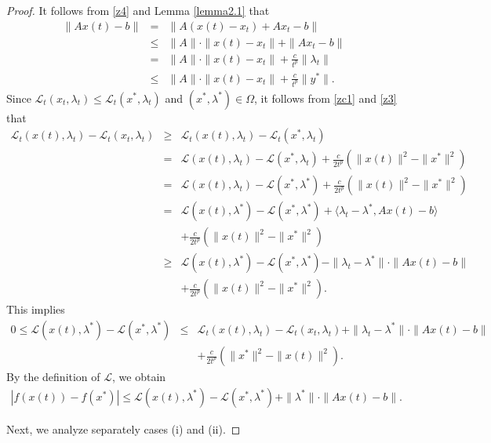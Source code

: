 \documentclass[review]{elsarticle}
\begin{document}
\begin{proof}
	It follows from \eqref{z4} and Lemma \ref{lemma2.1} that
		\begin{eqnarray}\label{zd1}
			\|Ax(t)-b\|&=&\|A(x(t)-x_t)+Ax_t-b\|\nonumber\\
			&\leq&\|A\|\cdot\|x(t)-x_t\|+\|Ax_t-b\|\nonumber\\
			&=&\|A\|\cdot\|x(t)-x_t\|+\frac{c}{t^p}\|\lambda_t\|\nonumber\\
			&\leq&\|A\|\cdot\|x(t)-x_t\|+\frac{c}{t^p}\|y^*\|.
		\end{eqnarray}	
		Since $\mathcal{L}_{t}(x_t,\lambda_t)\leq\mathcal{L}_{t}(x^*,\lambda_t)$ and  $(x^*,\lambda^*)\in\Omega$, it follows from \eqref{zc1} and \eqref{z3} that
		\begin{eqnarray*}
			\mathcal{L}_{t}(x(t),\lambda_t)-\mathcal{L}_{t}(x_t,\lambda_t)&\geq&\mathcal{L}_{t}(x(t),\lambda_t)-\mathcal{L}_{t}(x^*,\lambda_t)\\
			&=&\mathcal{L}(x(t),\lambda_t)-\mathcal{L}(x^*,\lambda_t)+\frac{c}{2t^p}\left(\|x(t)\|^2-\|x^*\|^2\right)\\
			&=&\mathcal{L}(x(t),\lambda_t)-\mathcal{L}(x^*,\lambda^*)+\frac{c}{2t^p}\left(\|x(t)\|^2-\|x^*\|^2\right)\\
			&=&\mathcal{L}(x(t),\lambda^*)-\mathcal{L}(x^*,\lambda^*)+\langle\lambda_t-\lambda^*, Ax(t)-b\rangle\\
			&&+\frac{c}{2t^p}\left(\|x(t)\|^2-\|x^*\|^2\right)\\
			&\geq&\mathcal{L}(x(t),\lambda^*)-\mathcal{L}(x^*,\lambda^*)-\|\lambda_t-\lambda^*\|\cdot\| Ax(t)-b\|\\
			&&+\frac{c}{2t^p}\left(\|x(t)\|^2-\|x^*\|^2\right).
		\end{eqnarray*}	
		This implies
		\begin{eqnarray}\label{z15}
			0\leq\mathcal{L}(x(t),\lambda^*)-\mathcal{L}(x^*,\lambda^*)
			&\leq&\mathcal{L}_{t}(x(t),\lambda_t)-\mathcal{L}_{t}(x_t,\lambda_t)+\|\lambda_t-\lambda^*\|\cdot\| Ax(t)-b\|\nonumber\\
			&&+\frac{c}{2t^p}\left(\|x^*\|^2-\|x(t)\|^2\right).
		\end{eqnarray}	
		By the definition of  $\mathcal{L}$, we obtain 
		\begin{eqnarray}\label{z16}
			|f(x(t))-f(x^*)|\leq\mathcal{L}(x(t),\lambda^*)-\mathcal{L}(x^*,\lambda^*)+\|\lambda^*\|\cdot\|Ax(t)-b\|.
		\end{eqnarray}
		
Next, we analyze separately  cases (i) and  (ii).


\end{proof}
\end{document}
